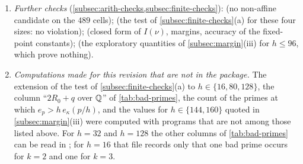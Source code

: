 \begin{enumerate}[(1)]
  marked with an asterisk, or counted as bad, in ; the program does
  not count a bad prime as a failure, including the two at which the exponent exceeds the number
  computed modulo $p$. These recomputations do not cover \cref{prop:nonvanishing}, the separation
  identity or the prime-number-theorem bookkeeping of \cref{thm:arithmetic}.
  \item \emph{Further checks} (\cref{subsec:arith-checks,subsec:finite-checks}):
   (no non-affine candidate on the $489$ cells);
   (the test of \cref{subsec:finite-checks}(a) for these
  four sizes: no violation);  (closed form of $I(\nu)$, margins,
  accuracy of the fixed-point constants);  (the exploratory
  quantities of \cref{subsec:margin}(iii) for $h\le96$, which prove nothing).
  \item \emph{Computations made for this revision that are not in the package.} The extension of
  the test of \cref{subsec:finite-checks}(a) to $h\in\{16,80,128\}$, the column ``$2R_0+q$ over
  $\mathbb{Q}$'' of \cref{tab:bad-primes}, the count of the primes at which $e_p>h\,e_\kappa(p/h)$, and the
  values for $h\in\{144,160\}$ quoted in \cref{subsec:margin}(iii) were computed with programs that
  are not among those listed above. For $h=32$ and $h=128$ the other columns of
  \cref{tab:bad-primes} can be read in ; for $h=16$ that file records
  only that one bad prime occurs for $k=2$ and one for $k=3$.
\end{enumerate}


